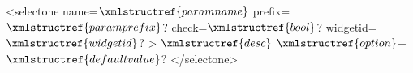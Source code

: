 <selectone name=$\xmlstructref{paramname}$
  prefix=$\xmlstructref{paramprefix}$? check=$\xmlstructref{bool}$? widgetid=$\xmlstructref{widgetid}$? >
  $\xmlstructref{desc}$
  $\xmlstructref{option}$+
  $\xmlstructref{defaultvalue}$?
</selectone>
